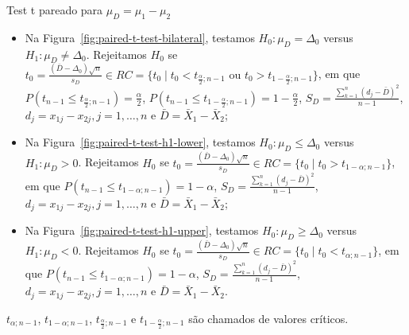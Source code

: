 \documentclass[9pt]{beamer}
\begin{document}
\begin{frame}{Test t pareado para $\mu_D = \mu_1 - \mu_2$}

\normalsize

\begin{itemize}
	\item Na Figura~\ref{fig:paired-t-test-bilateral}, testamos $H_0: \mu_D = \Delta_0$ versus $H_1: \mu_D \neq \Delta_0$. Rejeitamos $H_0$ se $t_0 = \frac{(\bar{D} - \Delta_0)\sqrt{n}}{ s_D } \in  RC=\{t_0 \mid t_0 < t_{\frac{\alpha}{2};n-1} \allowbreak \mbox{ ou } t_0 > t_{1-\frac{\alpha}{2};n-1} \}$, em que $P\left(t_{n-1} \leq t_{\frac{\alpha}{2}; n-1} \right) = \frac{\alpha}{2}$, $P\left(t_{n-1} \leq t_{1-\frac{\alpha}{2}; n-1} \right) = 1 - \frac{\alpha}{2}$, $S_D = \frac{\sum_{k=1}^{n}(d_j - \bar{D})^2}{n-1}$, $d_j = x_{1j} - x_{2j}, j=1, \dots, n$ e $\bar{D} = \bar{X}_1 - \bar{X}_2$;
	\vfill
	
	\item Na Figura~\ref{fig:paired-t-test-h1-lower}, testamos $H_0: \mu_D \leq \Delta_0 $ versus $H_1: \mu_D > 0$. Rejeitamos $H_0$ se $t_0 = \frac{(\bar{D} - \Delta_0)\sqrt{n}}{ s_D } \in \allowbreak RC=\{t_0 \mid t_0 > t_{1-\alpha; n-1}  \}$, em que $P\left(t_{n-1} \leq  t_{1-\alpha;n-1} \right) =1- \alpha$, $S_D = \frac{\sum_{k=1}^{n}(d_j - \bar{D})^2}{n-1}$, $d_j = x_{1j} - x_{2j}, j=1, \dots, n$ e $\bar{D} = \bar{X}_1 - \bar{X}_2$;
	\vfill
	
	\item Na Figura~\ref{fig:paired-t-test-h1-upper}, testamos $H_0: \mu_D \geq \Delta_0$ versus $H_1: \mu_D  < 0$. Rejeitamos $H_0$ se $t_0 = \frac{(\bar{D} - \Delta_0)\sqrt{n}}{ s_D } \in \allowbreak RC=\{t_0 \mid t_0 < t_{\alpha;n-1}  \}$, em que $P\left(t_{n-1} \leq  t_{1-\alpha;n-1} \right) =1- \alpha$, $S_D = \frac{\sum_{k=1}^{n}(d_j - \bar{D})^2}{n-1}$, $d_j = x_{1j} - x_{2j}, j=1, \dots, n$ e $\bar{D} = \bar{X}_1 - \bar{X}_2$.
\end{itemize}
$t_{\alpha;n-1}$, $t_{1-\alpha;n-1}$, $t_{\frac{\alpha}{2};n-1}$ e $t_{1-\frac{\alpha}{2};n-1}$ são chamados de valores críticos. 

\normalsize

\end{frame}
\end{document}
